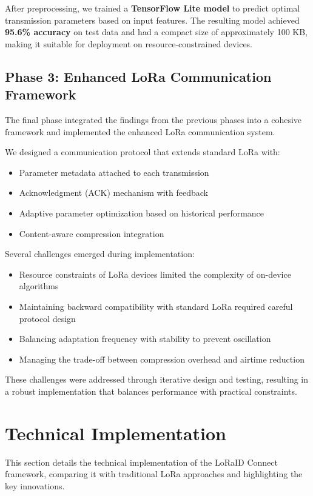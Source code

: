 \documentclass[conference]{IEEEtran}
\begin{document}
After preprocessing, we trained a \textbf{TensorFlow Lite model} to predict optimal transmission parameters based on input features. The resulting model achieved \textbf{95.6\% accuracy} on test data and had a compact size of approximately 100 KB, making it suitable for deployment on resource-constrained devices.

\subsection{Phase 3: Enhanced LoRa Communication Framework}
The final phase integrated the findings from the previous phases into a cohesive framework and implemented the enhanced LoRa communication system.

We designed a communication protocol that extends standard LoRa with:
\begin{itemize}
    \item Parameter metadata attached to each transmission
    \item Acknowledgment (ACK) mechanism with feedback
    \item Adaptive parameter optimization based on historical performance
    \item Content-aware compression integration
\end{itemize}

Several challenges emerged during implementation:
\begin{itemize}
    \item Resource constraints of LoRa devices limited the complexity of on-device algorithms
    \item Maintaining backward compatibility with standard LoRa required careful protocol design
    \item Balancing adaptation frequency with stability to prevent oscillation
    \item Managing the trade-off between compression overhead and airtime reduction
\end{itemize}

These challenges were addressed through iterative design and testing, resulting in a robust implementation that balances performance with practical constraints.

\section{Technical Implementation}
This section details the technical implementation of the LoRaID Connect framework, comparing it with traditional LoRa approaches and highlighting the key innovations.
\end{document}

